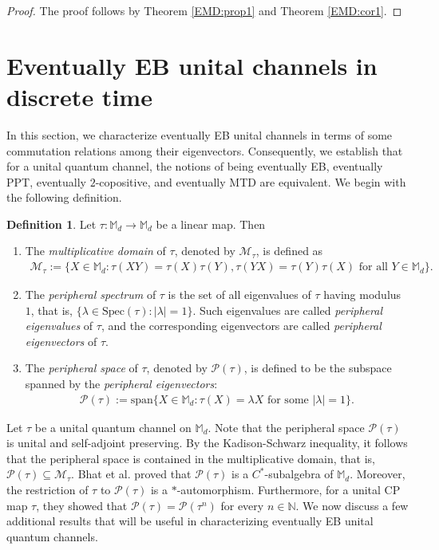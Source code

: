 \documentclass[11pt,reqno]{amsart}
\theoremstyle{definition}
\newtheorem{defn}{Definition}[section]
\theoremstyle{plain}
\theoremstyle{remark}
\numberwithin{equation}{section}%
\begin{document}
 
 \begin{proof}
 	The proof follows by Theorem \ref{EMD:prop1} and Theorem \ref{EMD:cor1}.
 \end{proof}
 
 

  
  
  
  \section{Eventually EB unital channels in discrete time}\label{discrete time}
  
  
In this section, we characterize eventually EB unital channels in terms of some commutation relations among their eigenvectors. Consequently, we establish that for a unital quantum channel, the notions of being eventually EB, eventually PPT, eventually $2$-copositive, and eventually MTD are equivalent.  We begin with the following definition.




\begin{defn}
	Let $\tau:\mathbb{M}_d\rightarrow\mathbb{M}_d$ be a linear map. Then
	\begin{enumerate}
		\item The \textit{multiplicative domain} of $\tau$, denoted by $\mathscr{M}_\tau$, is defined as
		\begin{align*}
			\mathscr{M}_\tau:=\{X\in\mathbb{M}_d: \tau(XY)=\tau(X)\tau(Y), \tau(YX)=\tau(Y)\tau(X) \text{ for all }Y\in\mathbb{M}_d\}.
		\end{align*}
		\item The \textit{peripheral spectrum} of $\tau$ is the set of all eigenvalues of $\tau$ having modulus $1$, that is, $\{\lambda\in\text{Spec}(\tau):\vert\lambda\vert=1\}$. Such eigenvalues are called \textit{peripheral eigenvalues} of $\tau$, and the corresponding eigenvectors are called \textit{peripheral eigenvectors} of $\tau$.
		\item The \textit{peripheral space} of $\tau$, denoted by $\mathcal{P}(\tau)$, is defined to be the subspace spanned by the \textit{peripheral eigenvectors}:
		\begin{align*}
			\mathcal{P}(\tau):=\text{span}\{X \in \mathbb{M}_d : \tau(X) = \lambda X \text{ for some } |\lambda| = 1\}.
		\end{align*}
	\end{enumerate}
\end{defn}


Let $\tau$ be a unital quantum channel on $\mathbb{M}_d$. Note that the peripheral space $\mathcal{P}(\tau)$ is unital and self-adjoint preserving. By the Kadison-Schwarz inequality, it follows that the peripheral space is contained in the multiplicative domain, that is, $\mathcal{P}(\tau)\subseteq \mathscr{M}_\tau$. Bhat et al. \cite{BKT, BKT2} proved that $\mathcal{P}(\tau)$ is a $C^*$-subalgebra of $\mathbb{M}_d$. Moreover, the restriction of $\tau$ to $\mathcal{P}(\tau)$ is a $*$-automorphism. Furthermore, for a unital CP map $\tau$, they showed that $\mathcal{P}(\tau)=\mathcal{P}(\tau^n)$ for every $n\in\mathbb{N}$. We now discuss a few additional results that will be useful in characterizing eventually EB unital quantum channels.
\end{document}
